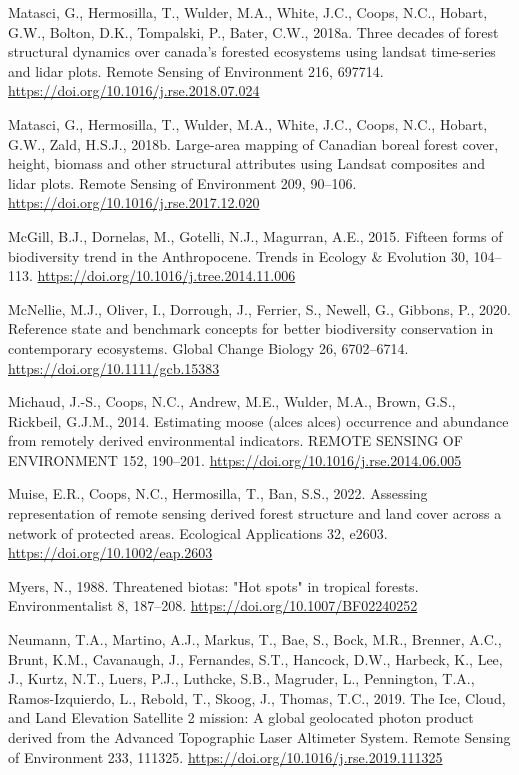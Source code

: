 \documentclass[
]{agujournal2019}
\newlength{\cslhangindent}
\newenvironment{CSLReferences}[2] %
 {\begin{list}{}{%
  \setlength{\itemindent}{0pt}
  \setlength{\leftmargin}{0pt}
  \setlength{\parsep}{0pt}
  \ifodd #1
   \setlength{\leftmargin}{\cslhangindent}
   \setlength{\itemindent}{-1\cslhangindent}
  \fi
  \setlength{\itemsep}{#2\baselineskip}}}
 {\end{list}}
\begin{document}
\begin{CSLReferences}{1}{0}
Matasci, G., Hermosilla, T., Wulder, M.A., White, J.C., Coops, N.C.,
Hobart, G.W., Bolton, D.K., Tompalski, P., Bater, C.W., 2018a. Three
decades of forest structural dynamics over canada's forested ecosystems
using landsat time-series and lidar plots. Remote Sensing of Environment
216, 697714. \url{https://doi.org/10.1016/j.rse.2018.07.024}

Matasci, G., Hermosilla, T., Wulder, M.A., White, J.C., Coops, N.C.,
Hobart, G.W., Zald, H.S.J., 2018b. Large-area mapping of Canadian boreal
forest cover, height, biomass and other structural attributes using
Landsat composites and lidar plots. Remote Sensing of Environment 209,
90--106. \url{https://doi.org/10.1016/j.rse.2017.12.020}

McGill, B.J., Dornelas, M., Gotelli, N.J., Magurran, A.E., 2015. Fifteen
forms of biodiversity trend in the Anthropocene. Trends in Ecology \&
Evolution 30, 104--113. \url{https://doi.org/10.1016/j.tree.2014.11.006}

McNellie, M.J., Oliver, I., Dorrough, J., Ferrier, S., Newell, G.,
Gibbons, P., 2020. Reference state and benchmark concepts for better
biodiversity conservation in contemporary ecosystems. Global Change
Biology 26, 6702--6714. \url{https://doi.org/10.1111/gcb.15383}

Michaud, J.-S., Coops, N.C., Andrew, M.E., Wulder, M.A., Brown, G.S.,
Rickbeil, G.J.M., 2014. Estimating moose (alces alces) occurrence and
abundance from remotely derived environmental indicators. REMOTE SENSING
OF ENVIRONMENT 152, 190--201.
\url{https://doi.org/10.1016/j.rse.2014.06.005}

Muise, E.R., Coops, N.C., Hermosilla, T., Ban, S.S., 2022. Assessing
representation of remote sensing derived forest structure and land cover
across a network of protected areas. Ecological Applications 32, e2603.
\url{https://doi.org/10.1002/eap.2603}

Myers, N., 1988. Threatened biotas: {"}Hot spots{"} in tropical forests.
Environmentalist 8, 187--208. \url{https://doi.org/10.1007/BF02240252}

Neumann, T.A., Martino, A.J., Markus, T., Bae, S., Bock, M.R., Brenner,
A.C., Brunt, K.M., Cavanaugh, J., Fernandes, S.T., Hancock, D.W.,
Harbeck, K., Lee, J., Kurtz, N.T., Luers, P.J., Luthcke, S.B., Magruder,
L., Pennington, T.A., Ramos-Izquierdo, L., Rebold, T., Skoog, J.,
Thomas, T.C., 2019. The Ice, Cloud, and Land Elevation Satellite
{\textendash} 2 mission: A global geolocated photon product derived from
the Advanced Topographic Laser Altimeter System. Remote Sensing of
Environment 233, 111325. \url{https://doi.org/10.1016/j.rse.2019.111325}


\end{CSLReferences}
\end{document}
